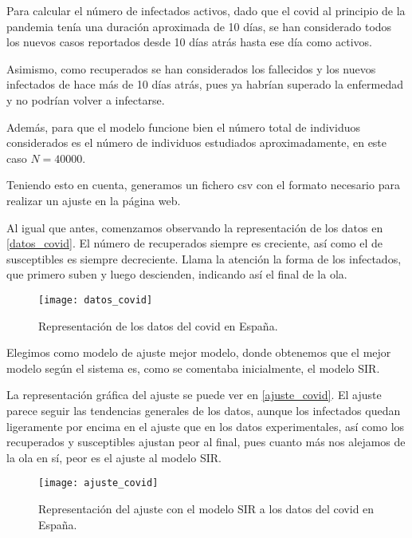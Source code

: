 Para calcular el número de infectados activos, dado que el covid al principio de la pandemia tenía una duración aproximada de 10 días, se han considerado todos los nuevos casos reportados desde 10 días atrás hasta ese día como activos.

Asimismo, como recuperados se han considerados los fallecidos y los nuevos infectados de hace más de 10 días atrás, pues ya habrían superado la enfermedad y no podrían volver a infectarse.

Además, para que el modelo funcione bien el número total de individuos considerados es el número de individuos estudiados aproximadamente, en este caso $N=40000$.

Teniendo esto en cuenta, generamos un fichero csv con el formato necesario para realizar un ajuste en la página web.

Al igual que antes, comenzamos observando la representación de los datos en \eqref{datos_covid}. El número de recuperados siempre es creciente, así como el de susceptibles es siempre decreciente. Llama la atención la forma de los infectados, que primero suben y luego descienden, indicando así el final de la ola.

\begin{figure}
\begin{center}
\caption{Representación de los datos del covid en España.}
\label{datos_covid}
\texttt{[image: datos\_covid]}
\end{center}
\end{figure}

Elegimos como modelo de ajuste mejor modelo, donde obtenemos que el mejor modelo según el sistema es, como se comentaba inicialmente, el modelo SIR.

La representación gráfica del ajuste se puede ver en \eqref{ajuste_covid}. El ajuste parece seguir las tendencias generales de los datos, aunque los infectados quedan ligeramente por encima en el ajuste que en los datos experimentales, así como los recuperados y susceptibles ajustan peor al final, pues cuanto más nos alejamos de la ola en sí, peor es el ajuste al modelo SIR.

\begin{figure}
\begin{center}
\caption{Representación del ajuste con el modelo SIR a los datos del covid en España.}
\label{ajuste_covid}
\texttt{[image: ajuste\_covid]}
\end{center}
\end{figure}

